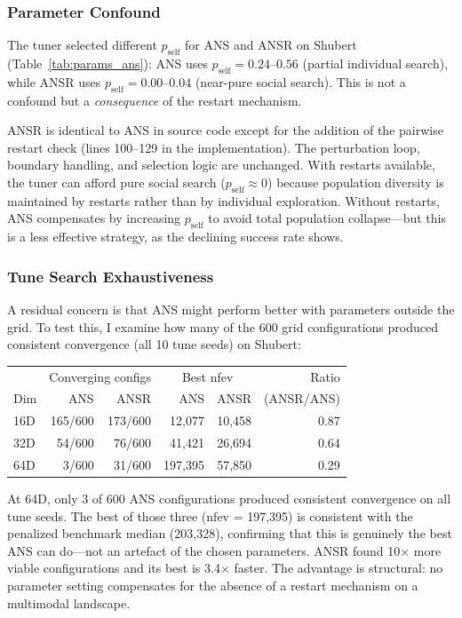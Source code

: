 \documentclass[11pt,a4paper]{article}
\begin{document}
\subsubsection{Parameter Confound}

The tuner selected different $p_{\text{self}}$ for ANS and ANSR on Shubert (Table~\ref{tab:params_ans}): ANS uses $p_{\text{self}} = 0.24$--$0.56$ (partial individual search), while ANSR uses $p_{\text{self}} = 0.00$--$0.04$ (near-pure social search). This is not a confound but a \emph{consequence} of the restart mechanism.

ANSR is identical to ANS in source code except for the addition of the pairwise restart check (lines 100--129 in the implementation). The perturbation loop, boundary handling, and selection logic are unchanged. With restarts available, the tuner can afford pure social search ($p_{\text{self}} \approx 0$) because population diversity is maintained by restarts rather than by individual exploration. Without restarts, ANS compensates by increasing $p_{\text{self}}$ to avoid total population collapse---but this is a less effective strategy, as the declining success rate shows.

\subsubsection{Tune Search Exhaustiveness}

A residual concern is that ANS might perform better with parameters outside the grid. To test this, I examine how many of the 600 grid configurations produced consistent convergence (all 10 tune seeds) on Shubert:

\begin{center}
\small
\begin{tabular}{@{}lrrrrr@{}}
\toprule
 & \multicolumn{2}{c}{Converging configs} & \multicolumn{2}{c}{Best nfev} & Ratio \\
Dim & ANS & ANSR & ANS & ANSR & (ANSR/ANS) \\
\midrule
16D & 165/600 & 173/600 & 12{,}077 & 10{,}458 & 0.87 \\
32D & 54/600  & 76/600  & 41{,}421 & 26{,}694 & 0.64 \\
64D & 3/600   & 31/600  & 197{,}395 & 57{,}850 & 0.29 \\
\bottomrule
\end{tabular}
\end{center}

At 64D, only 3 of 600 ANS configurations produced consistent convergence on all tune seeds. The best of those three (nfev = 197{,}395) is consistent with the penalized benchmark median (203{,}328), confirming that this is genuinely the best ANS can do---not an artefact of the chosen parameters. ANSR found 10$\times$ more viable configurations and its best is 3.4$\times$ faster. The advantage is structural: no parameter setting compensates for the absence of a restart mechanism on a multimodal landscape.
\end{document}
